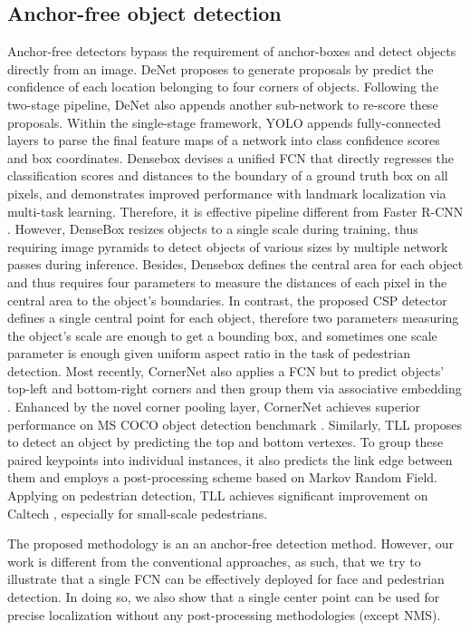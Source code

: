 \documentclass[review]{elsarticle}
\begin{document}
\subsection{Anchor-free object detection}
Anchor-free detectors bypass the requirement of anchor-boxes and detect objects directly from an image. DeNet \cite{tychsen2017denet} proposes to generate proposals by predict the confidence of each location belonging to four corners of objects. Following the two-stage pipeline, DeNet also appends another sub-network to re-score these proposals. Within the single-stage framework, YOLO \cite{redmon2016you} appends fully-connected layers to parse the final feature maps of a network into class confidence scores and box coordinates. Densebox \cite{huang2015densebox} devises a unified FCN that directly regresses the classification scores and distances to the boundary of a ground truth box on all pixels, and demonstrates improved performance with landmark localization via multi-task learning. Therefore, it is effective pipeline different from Faster R-CNN \cite{ren2015faster}. However, DenseBox resizes objects to a single scale during training, thus requiring image pyramids to detect objects of various sizes by multiple network passes during inference. Besides, Densebox defines the central area for each object and thus requires four parameters to measure the distances of each pixel in the central area to the object's boundaries. In contrast, the proposed CSP detector defines a single central point for each object, therefore two parameters measuring the object's scale are enough to get a bounding box, and sometimes one scale parameter is enough given uniform aspect ratio in the task of pedestrian detection.
Most recently, CornerNet \cite{Law_2018_ECCV} also applies a FCN but to predict objects' top-left and bottom-right corners and then group them via associative embedding \cite{newell2017associative}. Enhanced by the novel corner pooling layer, CornerNet achieves superior performance on MS COCO object detection benchmark \cite{lin2014microsoft}. Similarly, TLL \cite{Song_2018_ECCV} proposes to detect an object by predicting the top and bottom vertexes. To group these paired keypoints into individual instances, it also predicts the link edge between them and employs a post-processing scheme based on Markov Random Field. Applying on pedestrian detection, TLL achieves significant improvement on Caltech \cite{dollar2012pedestrian}, especially for small-scale pedestrians.

The proposed methodology is an an anchor-free detection method. However, our work is different from the conventional approaches, as such, that we try to illustrate that a single FCN can be effectively deployed for face and pedestrian detection. In doing so, we also show that a single center point can be used for precise localization without any post-processing methodologies (except NMS).    
\end{document}
